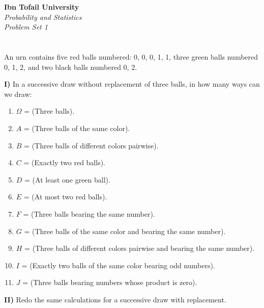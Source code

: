 \documentclass[12pt]{article}
\begin{document}
\begin{center}
\Large\textbf{Ibn Tofail University} \\[1em]
\large\textit{Probability and Statistics} \\[2em]
\large\textit{Problem Set 1} \\[0.5em]
\end{center}

\vspace{1cm}

\section{}
An urn contains five red balls numbered: 0, 0, 0, 1, 1, three green balls numbered 0, 1, 2, and two black balls numbered 0, 2. 

\textbf{I)} In a successive draw without replacement of three balls, in how many ways can we draw:

\begin{enumerate}
    \item $\Omega$ = (Three balls).
    \item $A$ = (Three balls of the same color).
    \item $B$ = (Three balls of different colors pairwise).
    \item $C$ = (Exactly two red balls).
    \item $D$ = (At least one green ball).
    \item $E$ = (At most two red balls).
    \item $F$ = (Three balls bearing the same number).
    \item $G$ = (Three balls of the same color and bearing the same number).
    \item $H$ = (Three balls of different colors pairwise and bearing the same number).
    \item $I$ = (Exactly two balls of the same color bearing odd numbers).
    \item $J$ = (Three balls bearing numbers whose product is zero).
\end{enumerate}

\textbf{II)} Redo the same calculations for a successive draw with replacement.
\end{document}
